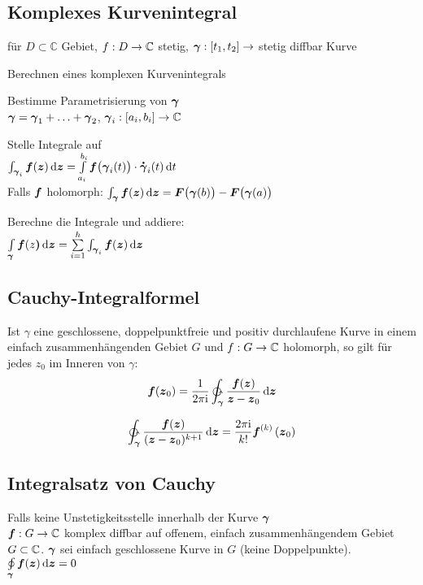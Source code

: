 \documentclass[german,color,5pt]{latex4ei/latex4ei_fs}
\begin{document}
\begin{sectionbox}
	\subsection{Komplexes Kurvenintegral}
	für $D \subset \mathbb C$ Gebiet, $f: D \rightarrow \mathbb C$ stetig, $\boldsymbol{\gamma}: [t_1, t_2] \rightarrow $ stetig diffbar Kurve
	\begin{cookbox}{Berechnen eines komplexen Kurvenintegrals}
		\item Bestimme Parametrisierung von $\boldsymbol{\gamma}$ \\
		$\boldsymbol{\gamma} = \boldsymbol{\gamma}_1 + \ldots + \boldsymbol{\gamma}_2$, $\boldsymbol{\gamma}_i : [a_i, b_i] \rightarrow \mathbb C$
		\item Stelle Integrale auf \\
		$\int_{\cx \gamma_i} \cx f(\cx z) \diff \cx z = \int \limits_{a_i}^{b_i} \cx f\big(\cx \gamma_i(t)\big) \cdot \dot{\cx \gamma}_i (t) \diff t$\\
		Falls $\boldsymbol{f}$ holomorph: $\int_{\cx \gamma} \cx f(\cx z) \diff \cx z = \cx F\big(\cx \gamma(b)\big) - \cx F\big(\cx \gamma(a)\big)$
		\item Berechne die Integrale und addiere: \\
		$\int \limits_{\cx \gamma} \cx f(z\cx ) \diff \cx z = \sum \limits_{i = 1}^{h} \int_{\cx \gamma_i} \cx f(\cx z) \diff \cx z$
	\end{cookbox}
\end{sectionbox}

\begin{sectionbox}
	\subsection{Cauchy-Integralformel}
	Ist $\gamma$ eine geschlossene, doppelpunktfreie und positiv durchlaufene Kurve in einem einfach zusammenhängenden Gebiet $G$ und $f : G \rightarrow \mathbb{C}$ holomorph, so gilt für jedes $z_0$ im Inneren von $\gamma$: \\
	\[\cx f(\cx z_0) = \frac{1}{2\pi \i} \ointctrclockwise_{\cx \gamma} \frac{\cx f(\cx z)}{\cx z - \cx z_0} \diff \cx z\]
	\begin{emphbox}\vspace{-5pt}
		\[\ointctrclockwise_{\cx \gamma} \frac{\cx f(\cx z)}{(\cx z - \cx z_0)^{k+1}} \diff \cx z = \frac{2\pi \i}{k!} \cx f^{(k)}\left(\cx z_0\right)\]
	\end{emphbox}
\end{sectionbox}

\begin{sectionbox}
	\subsection{Integralsatz von Cauchy}
	Falls keine Unstetigkeitsstelle innerhalb der Kurve $\boldsymbol{\gamma}$\\ 
	$\boldsymbol{f}: G \rightarrow \mathbb C$ komplex diffbar auf offenem, einfach zusammenhängendem Gebiet $G \subset \mathbb C$. $\boldsymbol{\gamma}$ sei einfach geschlossene Kurve in $G$ (keine Doppelpunkte). \\
	$\oint \limits_{\cx \gamma} \cx f(\cx z) \diff \cx z = 0$
\end{sectionbox}
\end{document}
